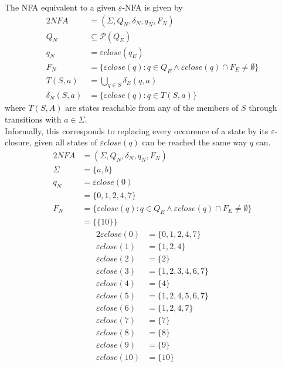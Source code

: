 \documentclass[docid=CA04]{tcom_CA}
\begin{document}
\setcounter{chapter}{3}
The NFA equivalent to a given $\varepsilon$-NFA is given by
\begin{alignat*}{2}
	NFA &= (\Sigma, Q_N, \delta_N, q_N, F_N)\\
	Q_N &\subseteq \mathscr{P}(Q_E)\\
	q_N &= \varepsilon close(q_E)\\
	F_N &= \{\varepsilon close(q)\colon q \in Q_E \wedge \varepsilon close(q) \cap F_E \neq \emptyset\}\\
	T(S,a)&= \bigcup_{q\in S}{\delta_E(q,a)}\\
	\delta_N(S,a) &= \{\varepsilon close(q)\colon q \in T(S,a)\}
\end{alignat*}
where $T(S,A)$ are states reachable from any of the members of $S$ through transitions with $a\in \Sigma$.\\
Informally, this corresponds to replacing every occurence of a state by its $\varepsilon$-closure, given all states of $\varepsilon close(q)$ can be reached the same way $q$ can.
\begin{alignat*}{2}
    NFA &= (\Sigma, Q_N, \delta_N, q_N, F_N)\\
    \Sigma &= \{a,b\}\\
	q_N &= \varepsilon close(0)\\
	    &= \{0,1,2,4,7\}\\
	F_N &= \{\varepsilon close(q)\colon q \in Q_E \wedge \varepsilon close(q) \cap F_E \neq \emptyset\}\\
	    &= \{\{10\}\}
\end{alignat*}
\begin{alignat*}{2}
	\varepsilon close(0)&=\{0,1,2,4,7\} \\
	\varepsilon close(1)&=\{1,2,4\} \\
	\varepsilon close(2)&=\{2\} \\
	\varepsilon close(3)&=\{1,2,3,4,6,7\} \\
	\varepsilon close(4)&=\{4\} \\
	\varepsilon close(5)&=\{1,2,4,5,6,7\} \\
	\varepsilon close(6)&=\{1,2,4,7\} \\
	\varepsilon close(7)&=\{7\} \\
	\varepsilon close(8)&=\{8\} \\
	\varepsilon close(9)&=\{9\} \\
	\varepsilon close(10)&=\{10\}
\end{alignat*}
\end{document}
